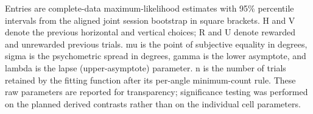 \vspace{4pt}
\par\noindent
\begin{minipage}{\linewidth}\small Entries are complete-data maximum-likelihood estimates with 95\% percentile intervals from the aligned joint session bootstrap in square brackets. H and V denote the previous horizontal and vertical choices; R and U denote rewarded and unrewarded previous trials. mu is the point of subjective equality in degrees, sigma is the psychometric spread in degrees, gamma is the lower asymptote, and lambda is the lapse (upper-asymptote) parameter. n is the number of trials retained by the fitting function after its per-angle minimum-count rule. These raw parameters are reported for transparency; significance testing was performed on the planned derived contrasts rather than on the individual cell parameters.\end{minipage}